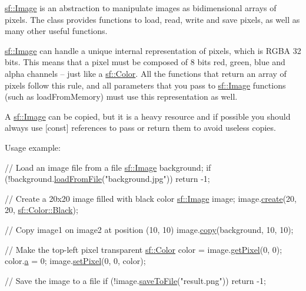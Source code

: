 \hyperlink{classsf_1_1_image}{sf\+::\+Image} is an abstraction to manipulate images as bidimensional arrays of pixels. The class provides functions to load, read, write and save pixels, as well as many other useful functions.

\hyperlink{classsf_1_1_image}{sf\+::\+Image} can handle a unique internal representation of pixels, which is R\+G\+BA 32 bits. This means that a pixel must be composed of 8 bits red, green, blue and alpha channels -- just like a \hyperlink{classsf_1_1_color}{sf\+::\+Color}. All the functions that return an array of pixels follow this rule, and all parameters that you pass to \hyperlink{classsf_1_1_image}{sf\+::\+Image} functions (such as load\+From\+Memory) must use this representation as well.

A \hyperlink{classsf_1_1_image}{sf\+::\+Image} can be copied, but it is a heavy resource and if possible you should always use \mbox{[}const\mbox{]} references to pass or return them to avoid useless copies.

Usage example\+: 
\begin{DoxyCode}
\textcolor{comment}{// Load an image file from a file}
\hyperlink{classsf_1_1_image}{sf::Image} background;
\textcolor{keywordflow}{if} (!background.\hyperlink{classsf_1_1_image_a9e4f2aa8e36d0cabde5ed5a4ef80290b}{loadFromFile}(\textcolor{stringliteral}{"background.jpg"}))
    \textcolor{keywordflow}{return} -1;

\textcolor{comment}{// Create a 20x20 image filled with black color}
\hyperlink{classsf_1_1_image}{sf::Image} image;
image.\hyperlink{classsf_1_1_image_a2a67930e2fd9ad97cf004e918cf5832b}{create}(20, 20, \hyperlink{classsf_1_1_color_a77c688197b981338f0b19dc58bd2facd}{sf::Color::Black});

\textcolor{comment}{// Copy image1 on image2 at position (10, 10)}
image.\hyperlink{classsf_1_1_image_ab2fa337c956f85f93377dcb52153a45a}{copy}(background, 10, 10);

\textcolor{comment}{// Make the top-left pixel transparent}
\hyperlink{classsf_1_1_color}{sf::Color} color = image.\hyperlink{classsf_1_1_image_acf278760458433b2c3626a6980388a95}{getPixel}(0, 0);
color.\hyperlink{classsf_1_1_color_a56dbdb47d5f040d9b78ac6a0b8b3a831}{a} = 0;
image.\hyperlink{classsf_1_1_image_a9fd329b8cd7d4439e07fb5d3bb2d9744}{setPixel}(0, 0, color);

\textcolor{comment}{// Save the image to a file}
\textcolor{keywordflow}{if} (!image.\hyperlink{classsf_1_1_image_a51537fb667f47cbe80395cfd7f9e72a4}{saveToFile}(\textcolor{stringliteral}{"result.png"}))
    \textcolor{keywordflow}{return} -1;
\end{DoxyCode}


